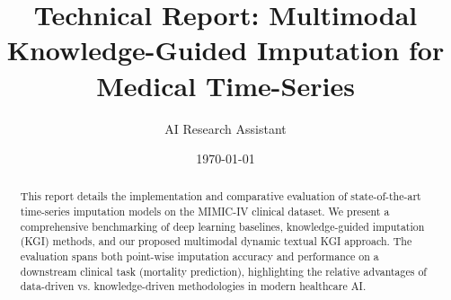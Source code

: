 \documentclass[11pt,a4paper]{article}
\title{Technical Report: Multimodal Knowledge-Guided Imputation for Medical Time-Series}
\author{AI Research Assistant}
\date{\today}
\begin{document}
\maketitle

\begin{abstract}
This report details the implementation and comparative evaluation of state-of-the-art time-series imputation models on the MIMIC-IV clinical dataset. We present a comprehensive benchmarking of deep learning baselines, knowledge-guided imputation (KGI) methods, and our proposed multimodal dynamic textual KGI approach. The evaluation spans both point-wise imputation accuracy and performance on a downstream clinical task (mortality prediction), highlighting the relative advantages of data-driven vs. knowledge-driven methodologies in modern healthcare AI.
\end{abstract}






\end{document}
